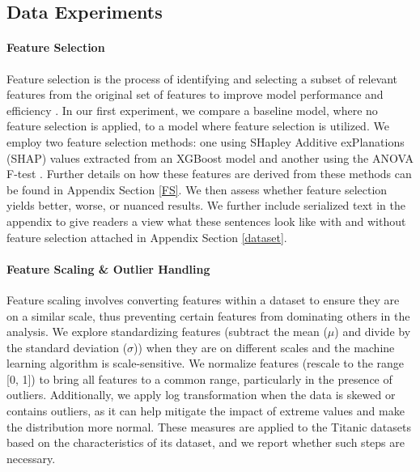 \documentclass{article}
\theoremstyle{plain}
\theoremstyle{definition}
\theoremstyle{remark}
\begin{document}
\subsection*{Data Experiments}
\paragraph{Feature Selection} Feature selection is the process of identifying and selecting a subset of relevant features from the original set of features to improve model performance and efficiency \cite{guyon2003introduction}. In our first experiment, we compare a baseline model, where no feature selection is applied, to a model where feature selection is utilized. We employ two feature selection methods: one using SHapley Additive exPlanations (SHAP) values extracted from an XGBoost model and another using the ANOVA F-test \cite{st1989analysis}. Further details on how these features are derived from these methods can be found in Appendix Section \ref{FS}. We then assess whether feature selection yields better, worse, or nuanced results. We further include serialized text in the appendix to give readers a view what these sentences look like with and without feature selection attached in Appendix Section \ref{dataset}.
\vspace{-0.35cm}

\paragraph{Feature Scaling \& Outlier Handling} \label{fss} Feature scaling involves converting features within a dataset to ensure they are on a similar scale, thus preventing certain features from dominating others in the analysis. We explore standardizing features (subtract the mean ($\mu$) and divide by the standard deviation ($\sigma$)) when they are on different scales and the machine learning algorithm is scale-sensitive. We normalize features (rescale to the range [0, 1]) to bring all features to a common range, particularly in the presence of outliers. Additionally, we apply log transformation when the data is skewed or contains outliers, as it can help mitigate the impact of extreme values and make the distribution more normal. These measures are applied to the Titanic \cite{eaton1995titanic} datasets based on the characteristics of its dataset, and we report whether such steps are necessary.
\vspace{-0.35cm}
\end{document}

